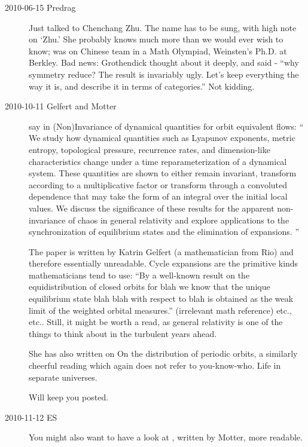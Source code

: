 \begin{description}
\item[2010-06-15 Predrag] Just talked to
{Chenchang Zhu}. The name has to be sung, with high note on `Zhu.'
She probably knows much more than we would ever wish to know;
was on Chinese team in a Math Olympiad, Weinsten's Ph.D. at Berkley.
Bad news: Grothendick thought about it deeply, and said
													\toCB
 - ``why
symmetry reduce? The result is invariably ugly. Let's keep everything
the way it is, and describe it in terms of categories.'' Not kidding.

\item[2010-10-11 Gelfert and Motter] say in
 {(Non)Invariance}  of dynamical
quantities for orbit equivalent flows: `` We study how dynamical
quantities such as Lyapunov exponents, metric entropy, topological
pressure, recurrence rates, and dimension-like characteristics change
under a time reparameterization of a dynamical system. These quantities
are shown to either remain invariant, transform according to a
multiplicative factor or transform through a convoluted dependence that
may take the form of an integral over the initial local values. We
discuss the significance of these results for the apparent non-invariance
of chaos in general relativity and explore applications to the
synchronization of equilibrium states and the elimination of expansions.
''

The paper is written by
{Katrin Gelfert} (a mathematician from Rio) and therefore essentially unreadable.
 Cycle expansions are the primitive kinds mathematicians tend to use:
``By a well-known result on the equidistribution of closed orbits for blah
we know that the unique equilibrium state blah blah with respect to blah
is obtained as the weak limit of the weighted orbital measures.''
(irrelevant math reference) etc., etc.. Still, it might be worth a read, as
general relativity is one of the things to think about in the
turbulent years ahead.

She has also written on
{On the distribution of periodic orbits}, a similarly cheerful reading
which again does not refer to you-know-who. Life in separate universes.

Will keep you posted.

\item[2010-11-12 ES] You might also want to have a look at \cite{motter09},
written by Motter, more readable.


\end{description}

